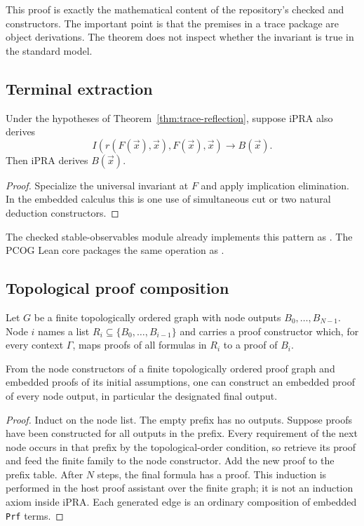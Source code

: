 This proof is exactly the mathematical content of the repository's checked
 and 
constructors.  The important point is that the premises in a trace package are
object derivations.  The theorem does not inspect whether the invariant is
true in the standard model.

\subsection{Terminal extraction}

\begin{corollary}
\label{cor:trace-finalization}
Under the hypotheses of Theorem~\ref{thm:trace-reflection}, suppose iPRA also
derives
\[
 I(r(F(\vec x),\vec x),F(\vec x),\vec x)\longrightarrow B(\vec x).
\]
Then iPRA derives \(B(\vec x)\).
\end{corollary}

\begin{proof}
Specialize the universal invariant at \(F\) and apply implication elimination.
In the embedded calculus this is one use of simultaneous cut or two natural
deduction constructors.
\end{proof}

The checked stable-observables module already implements this pattern as
.  The PCOG Lean core packages the same
operation as .

\subsection{Topological proof composition}

Let \(G\) be a finite topologically ordered graph with node outputs
\(B_0,\ldots,B_{N-1}\).  Node \(i\) names a list
\(R_i\subseteq\{B_0,\ldots,B_{i-1}\}\) and carries a proof constructor which,
for every context \(\Gamma\), maps proofs of all formulas in \(R_i\) to a
proof of \(B_i\).

\begin{theorem}
\label{thm:proof-graph}
From the node constructors of a finite topologically ordered proof graph and
embedded proofs of its initial assumptions, one can construct an embedded
proof of every node output, in particular the designated final output.
\end{theorem}

\begin{proof}
Induct on the node list.  The empty prefix has no outputs.  Suppose proofs have
been constructed for all outputs in the prefix.  Every requirement of the
next node occurs in that prefix by the topological-order condition, so retrieve
its proof and feed the finite family to the node constructor.  Add the new
proof to the prefix table.  After \(N\) steps, the final formula has a proof.
This induction is performed in the host proof assistant over the finite graph;
it is not an induction axiom inside iPRA.  Each generated edge is an ordinary
composition of embedded \texttt{Prf} terms.
\end{proof}

